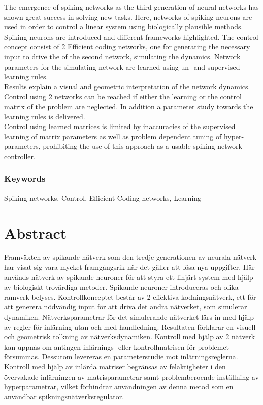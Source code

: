 
The emergence of spiking networks as the third generation of neural networks has shown great success in solving new tasks. Here, networks of spiking neurons are used in order to control a linear system using biologically plausible methods. Spiking neurons are introduced and different frameworks highlighted. The control concept consist of  2 Efficient coding networks, one for generating the necessary input to drive the of the second network, simulating the dynamics. Network parameters for the simulating network are learned using un- and supervised learning rules.\\
Results explain a visual and geometric interpretation of the network dynamics. Control using 2 networks can be reached if either the learning or the control matrix of the problem are neglected. In addition a parameter study towards the learning rules is delivered.\\
Control using learned matrices is limited by inaccuracies of the supervised learning of matrix parameters as well as problem dependent tuning of hyper-parameters, prohibiting the use of this approach as a usable spiking network controller.


\subsection*{Keywords}
Spiking networks, Control, Efficient Coding networks, Learning





\newpage
\thispagestyle{plain}
\chapter*{Abstract}
Framväxten av spikande nätverk som den tredje generationen av neurala nätverk har visat sig vara mycket framgångsrik när det gäller att lösa nya uppgifter. Här används nätverk av spikande neuroner för att styra ett linjärt system med hjälp av biologiskt trovärdiga metoder. Spikande neuroner introduceras och olika ramverk belyses. Kontrollkonceptet består av 2 effektiva kodningsnätverk, ett för att generera nödvändig input för att driva det andra nätverket, som simulerar dynamiken. Nätverksparametrar för det simulerande nätverket lärs in med hjälp av regler för inlärning utan och med handledning.
Resultaten förklarar en visuell och geometrisk tolkning av nätverksdynamiken. Kontroll med hjälp av 2 nätverk kan uppnås om antingen inlärnings- eller kontrollmatrisen för problemet försummas. Dessutom levereras en parameterstudie mot inlärningsreglerna.\\
Kontroll med hjälp av inlärda matriser begränsas av felaktigheter i den övervakade inlärningen av matrisparametrar samt problemberoende inställning av hyperparametrar, vilket förhindrar användningen av denna metod som en användbar spikningsnätverksregulator.


